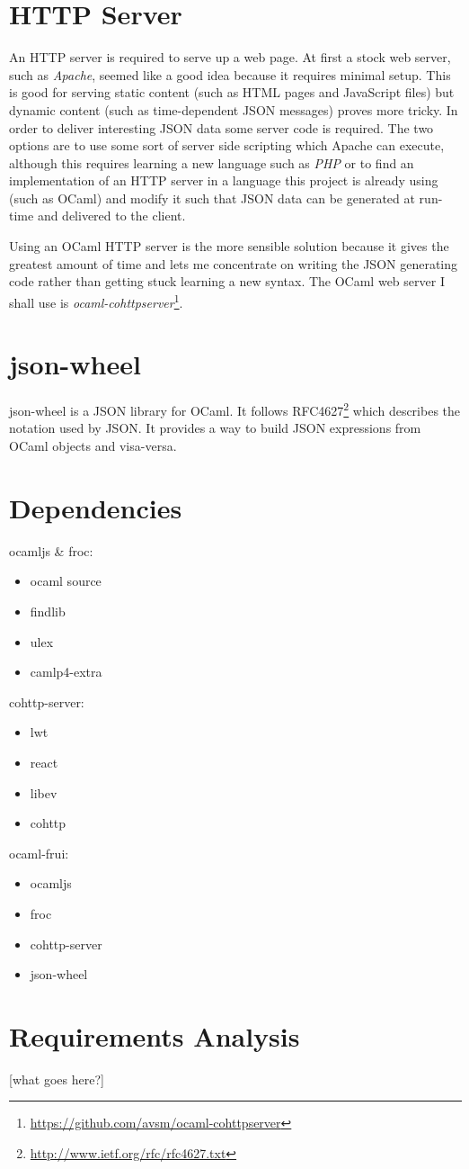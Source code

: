\section{HTTP Server}
An HTTP server is required to serve up a web page. At first a stock web server, such as \emph{Apache}, seemed like a good idea because it requires minimal setup. This is good for serving static content (such as HTML pages and JavaScript files) but dynamic content (such as time-dependent JSON messages) proves more tricky. In order to deliver interesting JSON data some server code is required. The two options are to use some sort of server side scripting which Apache can execute, although this requires learning a new language such as \emph{PHP} or to find an implementation of an HTTP server in a language this project is already using (such as OCaml) and modify it such that JSON data can be generated at run-time and delivered to the client.

Using an OCaml HTTP server is the more sensible solution because it gives the greatest amount of time and lets me concentrate on writing the JSON generating code rather than getting stuck learning a new syntax. The OCaml web server I shall use is \emph{ocaml-cohttpserver}\footnote{\url{https://github.com/avsm/ocaml-cohttpserver}}.

\section{json-wheel}
json-wheel is a JSON library for OCaml. It follows RFC4627\footnote{\url{http://www.ietf.org/rfc/rfc4627.txt}} which describes the notation used by JSON. It provides a way to build JSON expressions from OCaml objects and visa-versa.

\section{Dependencies}
ocamljs \& froc:
\begin{itemize}
\item ocaml source
\item findlib
\item ulex
\item camlp4-extra
\end{itemize}
cohttp-server:
\begin{itemize}
\item lwt
\item react
\item libev
\item cohttp
\end{itemize}
ocaml-frui:
\begin{itemize}
\item ocamljs
\item froc
\item cohttp-server
\item json-wheel
\end{itemize}

\section{Requirements Analysis}
[what goes here?]
